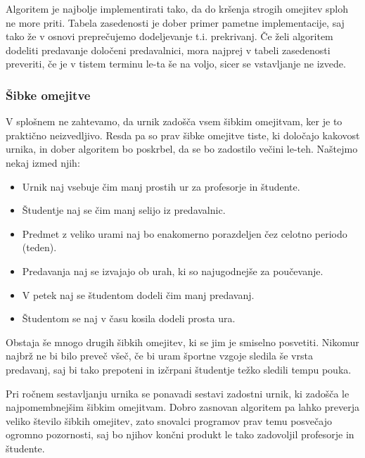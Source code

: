 \documentclass[a4paper,10pt]{article}
\begin{document}
Algoritem je najbolje implementirati tako, da do kršenja strogih omejitev sploh ne more priti.
Tabela zasedenosti je dober primer pametne implementacije, saj tako že v osnovi  preprečujemo
dodeljevanje t.i. prekrivanj. Če želi algoritem dodeliti predavanje določeni predavalnici,
mora najprej v tabeli zasedenosti preveriti, če je v tistem terminu le-ta še na voljo,
sicer se vstavljanje ne izvede.

\subsubsection{Šibke omejitve} %

V splošnem ne zahtevamo, da urnik zadošča vsem šibkim omejitvam, ker je to praktično neizvedljivo.
Resda pa so prav šibke omejitve tiste, ki določajo kakovost urnika, in dober algoritem bo
poskrbel, da se bo zadostilo večini le-teh. Naštejmo nekaj izmed njih:


  
  \begin{itemize}
    \item Urnik naj vsebuje čim manj prostih ur za profesorje in študente.
    \item Študentje naj se čim manj selijo iz predavalnic.
    \item Predmet z veliko urami naj bo enakomerno porazdeljen čez celotno periodo (teden).
    \item Predavanja naj se izvajajo ob urah, ki so najugodnejše za poučevanje.
    \item V petek naj se študentom dodeli čim manj predavanj.
    \item Študentom se naj v času kosila dodeli prosta ura.
 
  \end{itemize}

\noindent
Obstaja še mnogo drugih šibkih omejitev, ki se jim je smiselno posvetiti. Nikomur najbrž ne
bi bilo preveč všeč, če bi uram športne vzgoje sledila še vrsta predavanj, saj bi tako
prepoteni in izčrpani študentje težko sledili tempu pouka.

Pri ročnem sestavljanju urnika se ponavadi sestavi zadostni urnik, ki zadošča le
najpomembnejšim šibkim omejitvam. Dobro zasnovan algoritem pa lahko preverja veliko
število šibkih omejitev, zato snovalci programov prav temu posvečajo ogromno pozornosti,
saj bo njihov končni produkt le tako zadovoljil profesorje in študente.
\end{document}
